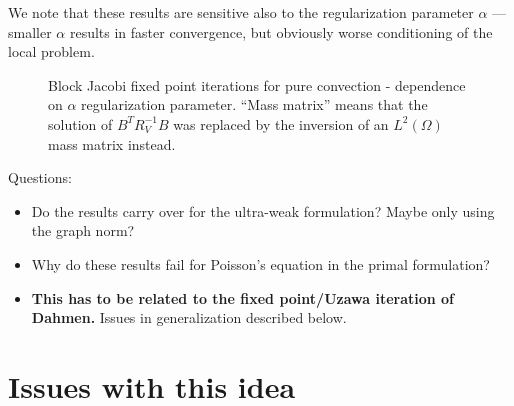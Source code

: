 \documentclass{article}
\newcommand{\LRp}[1]{\left( #1 \right)}
\renewcommand{\L}{L^2\LRp{\Omega}}
\begin{document}
We note that these results are sensitive also to the regularization parameter $\alpha$ --- smaller $\alpha$ results in faster convergence, but obviously worse conditioning of the local problem.  
\begin{figure}
\centering
{}
\caption{Block Jacobi fixed point iterations for pure convection - dependence on $\alpha$ regularization parameter.  ``Mass matrix'' means that the solution of $B^TR_V^{-1}B$ was replaced by the inversion of an $\L$ mass matrix instead.}
\end{figure}

Questions: 
\begin{itemize}
\item Do the results carry over for the ultra-weak formulation?  Maybe only using the graph norm?  
\item Why do these results fail for Poisson's equation in the primal formulation?  
\item \textbf{This has to be related to the fixed point/Uzawa iteration of Dahmen.}  Issues in generalization described below.
\end{itemize}

\section{Issues with this idea}
\end{document}
